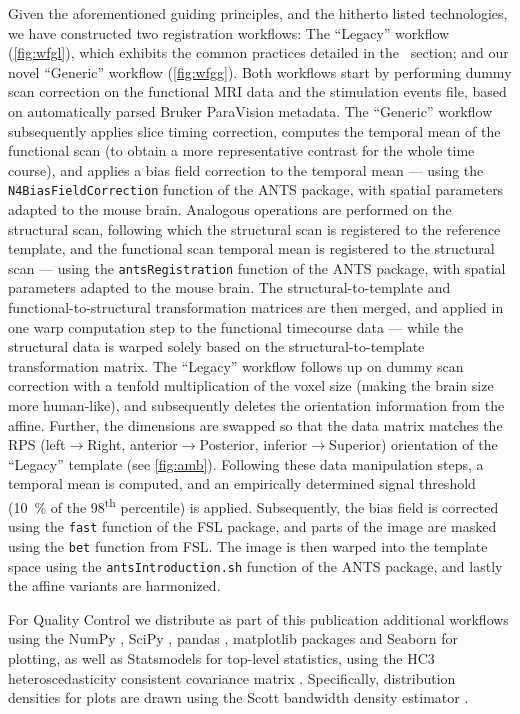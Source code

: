 Given the aforementioned guiding principles, and the hitherto listed technologies, we have constructed two registration workflows: The “Legacy” workflow (\cref{fig:wfgl}), which exhibits the common practices detailed in the ~section; and our novel “Generic” workflow (\cref{fig:wfgg}).
Both workflows start by performing dummy scan correction on the functional MRI data and the stimulation events file, based on automatically parsed Bruker ParaVision metadata.
The “Generic” workflow subsequently applies slice timing correction, computes the temporal mean of the functional scan (to obtain a more representative contrast for the whole time course), and applies a bias field correction to the temporal mean --- using the \textcolor{mg}{\texttt{N4BiasFieldCorrection}} function of the ANTS package, with spatial parameters adapted to the mouse brain.
Analogous operations are performed on the structural scan, following which the structural scan is registered to the reference template, and the functional scan temporal mean is registered to the structural scan --- using the \textcolor{mg}{\texttt{antsRegistration}} function of the ANTS package, with spatial parameters adapted to the mouse brain.
The structural-to-template and functional-to-structural transformation matrices are then merged, and applied in one warp computation step to the functional timecourse data --- while the structural data is warped solely based on the structural-to-template transformation matrix. 
The “Legacy” workflow follows up on dummy scan correction with a tenfold multiplication of the voxel size (making the brain size more human-like), and subsequently deletes the orientation information from the affine.
Further, the dimensions are swapped so that the data matrix matches the RPS (left$\rightarrow$Right, anterior$\rightarrow$Posterior, inferior$\rightarrow$Superior) orientation of the “Legacy” template (see \cref{fig:amb}).
Following these data manipulation steps, a temporal mean is computed, and an empirically determined signal threshold (\SI{10}{\percent} of the 98\textsuperscript{th} percentile) is applied.
Subsequently, the bias field is corrected using the \textcolor{mg}{\texttt{fast}} function of the FSL package, and parts of the image are masked using the \textcolor{mg}{\texttt{bet}} function from FSL. 
The image is then warped into the template space using the \textcolor{mg}{\texttt{antsIntroduction.sh}} function of the ANTS package, and lastly the affine variants are harmonized.

For Quality Control we distribute as part of this publication additional workflows using the NumPy \cite{numpy}, SciPy \cite{scipy}, pandas \cite{pandas}, matplotlib packages \cite{matplotlib} and Seaborn \cite{seaborn} for plotting, as well as Statsmodels \cite{statsmodels} for top-level statistics, using the HC3 heteroscedasticity consistent covariance matrix \cite{long2000using}.
Specifically, distribution densities for plots are drawn using the Scott bandwidth density estimator \cite{Scott1979}.

